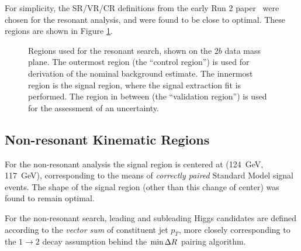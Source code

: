 For simplicity, the SR/VR/CR definitions from the early Run 2 paper~\cite{EXOT-2016-31} were chosen 
for the resonant analysis, and were found to be close to optimal. These regions are shown in Figure 
\ref{fig:res-regions}.

\begin{figure}
\centering
{}
\caption{\label{fig:res-regions} Regions used for the resonant search, shown on the $2b$ data  
mass plane. The outermost region (the ``control region'') is used for derivation of the nominal 
background estimate. The innermost region is the signal region, where the signal extraction 
fit is performed. The region in between (the ``validation region'') is used for the assessment of an 
uncertainty.}
\end{figure}

\subsection{Non-resonant Kinematic Regions}
For the non-resonant analysis the signal region is centered at (\SI{124}{\GeV}, \SI{117}{\GeV}),
corresponding to the means of \emph{correctly paired} Standard Model signal events. The shape of 
the signal region (other than this change of center) was found to remain optimal.

For the non-resonant search, leading and subleading Higgs candidates are defined according to the 
\emph{vector sum} of constituent jet $p_{T}$, more closely corresponding to the $1\rightarrow 2$ decay assumption
behind the $\min{\ensuremath{\Delta R}}$ pairing algorithm. 

